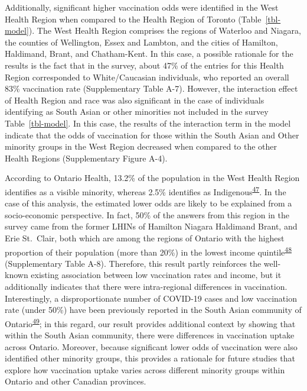 \documentclass[
  letterpaper,
  DIV=11,
  numbers=noendperiod]{scrartcl}
\begin{document}
Additionally, significant higher vaccination odds were identified in the
West Health Region when compared to the Health Region of Toronto
(Table~\ref{tbl-model}). The West Health Region comprises the regions of
Waterloo and Niagara, the counties of Wellington, Essex and Lambton, and
the cities of Hamilton, Haldimand, Brant, and Chatham-Kent. In this
case, a possible rationale for the results is the fact that in the
survey, about 47\% of the entries for this Health Region corresponded to
White/Caucasian individuals, who reported an overall 83\% vaccination
rate (Supplementary Table A-7). However, the interaction effect of
Health Region and race was also significant in the case of individuals
identifying as South Asian or other minorities not included in the
survey Table~\ref{tbl-model}. In this case, the results of the
interaction term in the model indicate that the odds of vaccination for
those within the South Asian and Other minority groups in the West
Region decreased when compared to the other Health Regions
(Supplementary Figure A-4).

According to Ontario Health, 13.2\% of the population in the West Health
Region identifies as a visible minority, whereas 2.5\% identifies as
Indigenous\textsuperscript{\protect\hyperlink{ref-ontariohealth}{47}}.
In the case of this analysis, the estimated lower odds are likely to be
explained from a socio-economic perspective. In fact, 50\% of the
answers from this region in the survey came from the former LHINs of
Hamilton Niagara Haldimand Brant, and Erie St.~Clair, both which are
among the regions of Ontario with the highest proportion of their
population (more than 20\%) in the lowest income
quintile\textsuperscript{\protect\hyperlink{ref-buajitti2018}{48}}
(Supplementary Table A-8). Therefore, this result partly reinforces the
well-known existing association between low vaccination rates and
income, but it additionally indicates that there were intra-regional
differences in vaccination. Interestingly, a disproportionate number of
COVID-19 cases and low vaccination rate (under 50\%) have been
previously reported in the South Asian community of
Ontario\textsuperscript{\protect\hyperlink{ref-anand2022}{49}}; in this
regard, our result provides additional context by showing that within
the South Asian community, there were differences in vaccination uptake
across Ontario. Moreover, because significant lower odds of vaccination
were also identified other minority groups, this provides a rationale
for future studies that explore how vaccination uptake varies across
different minority groups within Ontario and other Canadian provinces.
\end{document}
